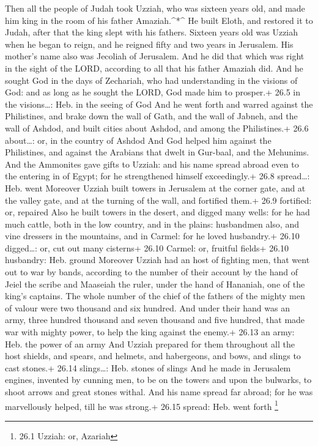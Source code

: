  Then all the people of Judah took Uzziah, who was sixteen
years old, and made him king in the room of his father Amaziah.\^{}*\^{}
 He built Eloth, and restored it to Judah, after that the
king slept with his fathers.  Sixteen years old was Uzziah
when he began to reign, and he reigned fifty and two years in Jerusalem.
His mother's name also was Jecoliah of Jerusalem.  And he
did that which was right in the sight of the LORD, according to all that
his father Amaziah did.  And he sought God in the days of
Zechariah, who had understanding in the visions of God: and as long as
he sought the LORD, God made him to prosper.+ 26.5 in the visions\ldots:
Heb. in the seeing of God  And he went forth and warred
against the Philistines, and brake down the wall of Gath, and the wall
of Jabneh, and the wall of Ashdod, and built cities about Ashdod, and
among the Philistines.+ 26.6 about\ldots: or, in the country of Ashdod
 And God helped him against the Philistines, and against the
Arabians that dwelt in Gur-baal, and the Mehunims.  And the
Ammonites gave gifts to Uzziah: and his name spread abroad even to the
entering in of Egypt; for he strengthened himself exceedingly.+ 26.8
spread\ldots: Heb. went  Moreover Uzziah built towers in
Jerusalem at the corner gate, and at the valley gate, and at the turning
of the wall, and fortified them.+ 26.9 fortified: or, repaired
 Also he built towers in the desert, and digged many wells:
for he had much cattle, both in the low country, and in the plains:
husbandmen also, and vine dressers in the mountains, and in Carmel: for
he loved husbandry.+ 26.10 digged\ldots: or, cut out many cisterns+
26.10 Carmel: or, fruitful fields+ 26.10 husbandry: Heb. ground
 Moreover Uzziah had an host of fighting men, that went out
to war by bands, according to the number of their account by the hand of
Jeiel the scribe and Maaseiah the ruler, under the hand of Hananiah, one
of the king's captains.  The whole number of the chief of
the fathers of the mighty men of valour were two thousand and six
hundred.  And under their hand was an army, three hundred
thousand and seven thousand and five hundred, that made war with mighty
power, to help the king against the enemy.+ 26.13 an army: Heb. the
power of an army  And Uzziah prepared for them throughout
all the host shields, and spears, and helmets, and habergeons, and bows,
and slings to cast stones.+ 26.14 slings\ldots: Heb. stones of slings
 And he made in Jerusalem engines, invented by cunning men,
to be on the towers and upon the bulwarks, to shoot arrows and great
stones withal. And his name spread far abroad; for he was marvellously
helped, till he was strong.+ 26.15 spread: Heb. went forth \footnote{26.1
  Uzziah: or, Azariah}

